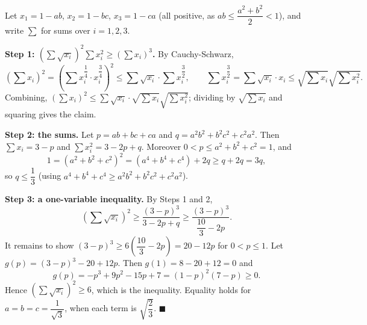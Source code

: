 Let $x_1=1-ab$, $x_2=1-bc$, $x_3=1-ca$ (all positive, as $ab\le\dfrac{a^2+b^2}{2}<1$), and write $\sum$ for sums over $i=1,2,3$.

\textbf{Step 1: $\left(\sum\sqrt{x_i}\right)^2\sum x_i^2\ge\left(\sum x_i\right)^3$.} By Cauchy-Schwarz,
\[
\left(\sum x_i\right)^2=\left(\sum x_i^{\dfrac{1}{4}}\cdot x_i^{\dfrac{3}{4}}\right)^2\le\sum\sqrt{x_i}\cdot\sum x_i^{\dfrac{3}{2}},
\qquad
\sum x_i^{\dfrac{3}{2}}=\sum\sqrt{x_i}\cdot x_i\le\sqrt{\sum x_i}\sqrt{\sum x_i^2}.
\]
Combining, $\left(\sum x_i\right)^2\le\sum\sqrt{x_i}\cdot\sqrt{\sum x_i}\sqrt{\sum x_i^2}$; dividing by $\sqrt{\sum x_i}$ and squaring gives the claim.

\textbf{Step 2: the sums.} Let $p=ab+bc+ca$ and $q=a^2b^2+b^2c^2+c^2a^2$. Then $\sum x_i=3-p$ and $\sum x_i^2=3-2p+q$. Moreover $0<p\le a^2+b^2+c^2=1$, and
\[
1=(a^2+b^2+c^2)^2=(a^4+b^4+c^4)+2q\ge q+2q=3q,
\]
so $q\le\dfrac{1}{3}$ (using $a^4+b^4+c^4\ge a^2b^2+b^2c^2+c^2a^2$).

\textbf{Step 3: a one-variable inequality.} By Steps 1 and 2,
\[
\left(\sum\sqrt{x_i}\right)^2\ge\dfrac{(3-p)^3}{3-2p+q}\ge\dfrac{(3-p)^3}{\dfrac{10}{3}-2p}.
\]
It remains to show $(3-p)^3\ge6\left(\dfrac{10}{3}-2p\right)=20-12p$ for $0<p\le1$. Let $g(p)=(3-p)^3-20+12p$. Then $g(1)=8-20+12=0$ and
\[
g(p)=-p^3+9p^2-15p+7=(1-p)^2(7-p)\ge0 .
\]
Hence $\left(\sum\sqrt{x_i}\right)^2\ge6$, which is the inequality. Equality holds for $a=b=c=\dfrac{1}{\sqrt3}$, when each term is $\sqrt{\dfrac{2}{3}}$. $\blacksquare$
